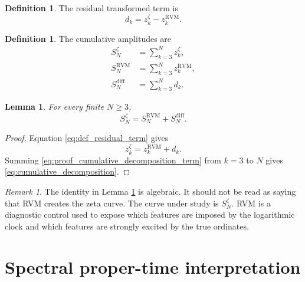 \documentclass[11pt]{amsart}
\numberwithin{equation}{section}
\theoremstyle{plain}
\newtheorem{lemma}[theorem]{Lemma}
\theoremstyle{definition}
\newtheorem{definition}[theorem]{Definition}
\theoremstyle{remark}
\newtheorem{remark}[theorem]{Remark}
\newcommand{\RVM}{\mathrm{RVM}}
\newcommand{\diff}{\mathrm{diff}}
\begin{document}
\begin{definition}
\label{def:residual_term}
The residual transformed term is
\begin{equation}
d_k
=
z_k^\zeta-z_k^{\RVM}.
\label{eq:def_residual_term}
\end{equation}
\end{definition}

\begin{definition}
\label{def:cumulative_amplitudes}
The cumulative amplitudes are
\begin{align}
S_N^\zeta
&=
\sum_{k=3}^{N}z_k^\zeta,
\label{eq:def_zeta_cumulative_amplitude}
\\
S_N^{\RVM}
&=
\sum_{k=3}^{N}z_k^{\RVM},
\label{eq:def_rvm_cumulative_amplitude}
\\
S_N^{\diff}
&=
\sum_{k=3}^{N}d_k.
\label{eq:def_diff_cumulative_amplitude}
\end{align}
\end{definition}

\begin{lemma}
\label{lem:cumulative_decomposition}
For every finite \(N\geq 3\),
\begin{equation}
S_N^\zeta
=
S_N^{\RVM}+S_N^{\diff}.
\label{eq:cumulative_decomposition}
\end{equation}
\end{lemma}

\begin{proof}
Equation \eqref{eq:def_residual_term} gives
\begin{equation}
z_k^\zeta
=
z_k^{\RVM}+d_k.
\label{eq:proof_cumulative_decomposition_term}
\end{equation}
Summing \eqref{eq:proof_cumulative_decomposition_term} from \(k=3\) to \(N\) gives \eqref{eq:cumulative_decomposition}.
\end{proof}

\begin{remark}
\label{rem:rvm_role}
The identity in Lemma \ref{lem:cumulative_decomposition} is algebraic.  It should not be read as saying that RVM creates the zeta curve.  The curve under study is \(S_N^\zeta\).  RVM is a diagnostic control used to expose which features are imposed by the logarithmic clock and which features are strongly excited by the true ordinates.
\end{remark}

\section{Spectral proper-time interpretation}
\label{sec:spectral_proper_time_interpretation}
\end{document}
